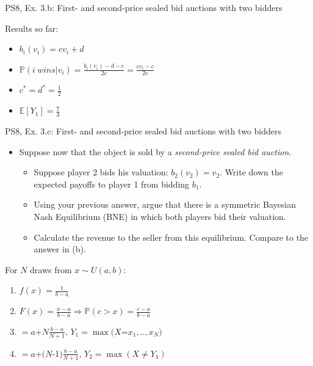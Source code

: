\begin{frame}{PS8, Ex. 3.b: First- and second-price sealed bid auctions with two bidders}
\begin{multicols}{2}
      \vspace{-6pt}
      Results so far:
      \vspace{-6pt}
      \begin{itemize}
        \item[($*$)]  $b_i(v_i) = cv_i+d$
        \item[($**$)] $\mathbb{P}(i\ wins|v_i)=\frac{b_i(v_i)-d-c}{2c}=\frac{cv_i-c}{2c}$
        \item[(3.a)]    $c^*=d^*=\frac{1}{2}$
        \item[\nth{1}:] $\mathbb{E}[Y_1]=\frac{7}{3}$
      \end{itemize}
      \vfill\null
    \end{multicols}
\end{frame}


\begin{frame}{PS8, Ex. 3.c: First- and second-price sealed bid auctions with two bidders}
    \begin{multicols}{2}
      \begin{itemize}
        \item[(c)] Suppose now that the object is sold by a \textit{second-price sealed bid auction}.
        \begin{itemize}\normalsize
          \item[i.]   Suppose player 2 bids his valuation: $b_2(v_2) = v_2$. Write down the expected payoffs to player 1 from bidding $b_1$.
          \item[ii.]  Using your previous answer, argue that there is a symmetric Bayesian Nash Equilibrium (BNE) in which both players bid their valuation.
          \item[iii.] Calculate the revenue to the seller from this equilibrium. Compare to the answer in (b).
        \end{itemize}
      \end{itemize}
      For $N$ draws from $x\sim U(a, b):$
      \vspace{-6pt}
      \begin{enumerate}
        \item[PDF:] $f(x)=\frac{1}{b-a}$
        \item[CDF:] $F(x)=\frac{x-a}{b-a}\Rightarrow\mathbb{P}(c>x)=\frac{c-a}{b-a}$
        \item[$\mathbb{E}(Y_1)$] $=a$+$N\frac{b-a}{N+1}$, $Y_1=\max(X$=$x_1,..,x_N)$
        \item[$\mathbb{E}(Y_2)$] $=a$+$(N$-1$)\frac{b-a}{N+1}$, $Y_2=\max(X\neq Y_1)$
      \end{enumerate}
      \vfill\null\columnbreak
      \vfill\null
    \end{multicols}
\end{frame}


